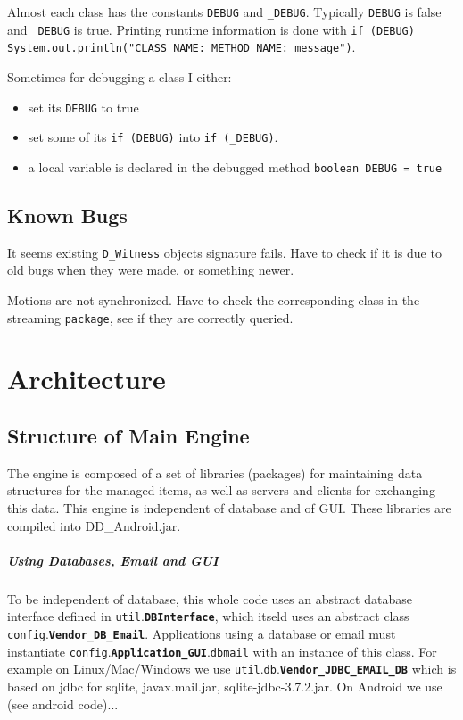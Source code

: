 \documentclass{book}
\newcommand{\pkg}[1]{{\tt #1}}
\newcommand{\cls}[1]{{\tt\bf #1}}
\newcommand{\mmb}[1]{{\tt #1}}
\begin{document}
Almost each class has the constants {\tt DEBUG} and {\tt \_DEBUG}. Typically {\tt DEBUG} is false and {\tt \_DEBUG}  is true.
Printing runtime information is done with {\tt if (DEBUG) System.out.println("CLASS\_NAME: METHOD\_NAME: message")}. 

Sometimes for debugging a class I either:
\begin{itemize}
\item
set its {\tt DEBUG} to true
\item
set some of its {\tt if (DEBUG)} into {\tt if (\_DEBUG)}.
\item
a local variable is declared in the debugged method  {\tt boolean DEBUG = true}
\end{itemize}

\section{Known Bugs}

It seems existing {\tt D\_Witness} objects signature fails. Have to check if it is due to old bugs when they were made, or something newer.

Motions are not synchronized. Have to check the corresponding class in the streaming {\tt package}, see if they are correctly queried.

\chapter{Architecture}
\section{Structure of Main Engine}

The engine is composed of a set of libraries (packages) for maintaining data structures for the managed items, as well as servers and clients
for exchanging this data. This engine is independent of database and of GUI. These libraries are compiled into DD\_Android.jar.

\paragraph{Using Databases, Email and GUI}
To be independent of database, this whole code uses an abstract database interface defined in \pkg{util}.\cls{DBInterface}, which
itseld uses an abstract class \pkg{config}.\cls{Vendor\_DB\_Email}. Applications using a database or email must instantiate
\pkg{config}.\cls{Application\_GUI}.\mmb{dbmail} with an instance of this class. For example on Linux/Mac/Windows we use \pkg{util}.\pkg{db}.\cls{Vendor\_JDBC\_EMAIL\_DB} which is based on jdbc for sqlite, javax.mail.jar, sqlite-jdbc-3.7.2.jar.
On Android we use (see android code)...
\end{document}
